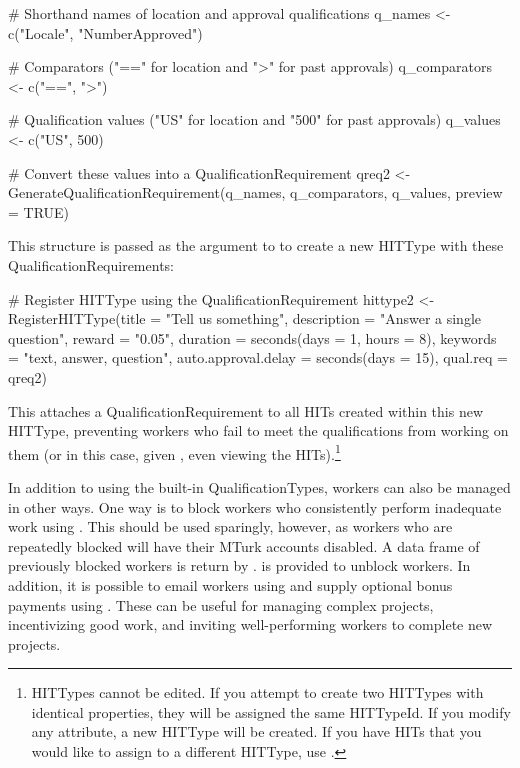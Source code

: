 \begin{example}
# Shorthand names of location and approval qualifications
q_names <- c("Locale", "NumberApproved")

# Comparators ("==" for location and ">" for past approvals)
q_comparators <- c("==", ">")

# Qualification values ("US" for location and "500" for past approvals)
q_values <- c("US", 500)

# Convert these values into a QualificationRequirement
qreq2 <- GenerateQualificationRequirement(q_names, 
                                          q_comparators, 
                                          q_values, 
                                          preview = TRUE)
\end{example}
%
\noindent This structure is passed as the  argument to  to create a new HITType with these QualificationRequirements:

\begin{example}
# Register HITType using the QualificationRequirement
hittype2 <- RegisterHITType(title = "Tell us something", 
                            description = "Answer a single question", 
                            reward = "0.05", 
                            duration = seconds(days = 1, hours = 8), 
                            keywords = "text, answer, question", 
                            auto.approval.delay = seconds(days = 15),
                            qual.req = qreq2)
\end{example}

\noindent This attaches a QualificationRequirement to all HITs created within this new HITType, preventing workers who fail to meet the qualifications from working on them (or in this case, given , even viewing the HITs).\footnote{HITTypes cannot be edited. If you attempt to create two HITTypes with identical properties, they will be assigned the same HITTypeId. If you modify any attribute, a new HITType will be created. If you have HITs that you would like to assign to a different HITType, use .} 

In addition to using the built-in QualificationTypes, workers  can also
be managed in other ways. One way is to block workers who
consistently perform inadequate work using . This
should be used sparingly, however, as workers who are repeatedly
blocked will have their MTurk accounts disabled. A
data frame  of previously blocked workers is return by
.   is provided to unblock workers.
In addition, it is possible to email workers
using  and supply optional bonus payments using
. These can be useful for managing complex projects,
incentivizing good work, and inviting well-performing workers to
complete new projects.

